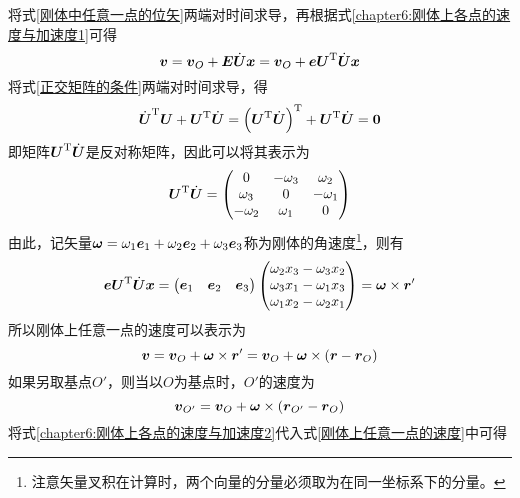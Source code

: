 将式\eqref{刚体中任意一点的位矢}两端对时间求导，再根据式\eqref{chapter6:刚体上各点的速度与加速度1}可得
\begin{equation}
	\boldsymbol{v} = \boldsymbol{v}_O + \boldsymbol{E} \dot{\boldsymbol{U}} \boldsymbol{x} = \boldsymbol{v}_O + \boldsymbol{e} \boldsymbol{U}^{\mathrm{T}} \dot{\boldsymbol{U}} \boldsymbol{x}
\end{equation}
将式\eqref{正交矩阵的条件}两端对时间求导，得
\begin{equation*}
	\dot{\boldsymbol{U}}^{\mathrm{T}} \boldsymbol{U} + \boldsymbol{U}^{\mathrm{T}} \dot{\boldsymbol{U}} = \left(\boldsymbol{U}^{\mathrm{T}} \dot{\boldsymbol{U}}\right)^{\mathrm{T}} + \boldsymbol{U}^{\mathrm{T}} \dot{\boldsymbol{U}} = \boldsymbol{0}
\end{equation*}
即矩阵$\boldsymbol{U}^{\mathrm{T}} \dot{\boldsymbol{U}}$是反对称矩阵，因此可以将其表示为
\begin{equation*}
	\boldsymbol{U}^{\mathrm{T}} \dot{\boldsymbol{U}} = \begin{pmatrix} 0 & -\omega_3 & \omega_2 \\ \omega_3 & 0 & -\omega_1 \\ -\omega_2 & \omega_1 & 0 \end{pmatrix}
\end{equation*}
由此，记矢量$\boldsymbol{\omega} = \omega_1 \boldsymbol{e}_1 + \omega_2 \boldsymbol{e}_2 + \omega_3 \boldsymbol{e}_3$称为刚体的{\heiti 角速度}\footnote{注意矢量叉积在计算时，两个向量的分量必须取为在同一坐标系下的分量。}，则有
\begin{equation*}
	\boldsymbol{e} \boldsymbol{U}^{\mathrm{T}} \dot{\boldsymbol{U}} \boldsymbol{x} = \begin{pmatrix} \boldsymbol{e}_1 & \boldsymbol{e}_2 & \boldsymbol{e}_3 \end{pmatrix} \begin{pmatrix} \omega_2 x_3 - \omega_3 x_2 \\ \omega_3 x_1 - \omega_1 x_3 \\ \omega_1 x_2 - \omega_2 x_1 \end{pmatrix} = \boldsymbol{\omega} \times \boldsymbol{r}'
\end{equation*}
所以刚体上任意一点的速度可以表示为
\begin{equation}
	\boldsymbol{v} = \boldsymbol{v}_O + \boldsymbol{\omega} \times \boldsymbol{r}' = \boldsymbol{v}_O + \boldsymbol{\omega} \times (\boldsymbol{r}-\boldsymbol{r}_O)
	\label{刚体上任意一点的速度}
\end{equation}
如果另取基点$O'$，则当以$O$为基点时，$O'$的速度为
\begin{equation}
	\boldsymbol{v}_{O'} = \boldsymbol{v}_O + \boldsymbol{\omega} \times (\boldsymbol{r}_{O'} - \boldsymbol{r}_O)
	\label{chapter6:刚体上各点的速度与加速度2}
\end{equation}
将式\eqref{chapter6:刚体上各点的速度与加速度2}代入式\eqref{刚体上任意一点的速度}中可得
